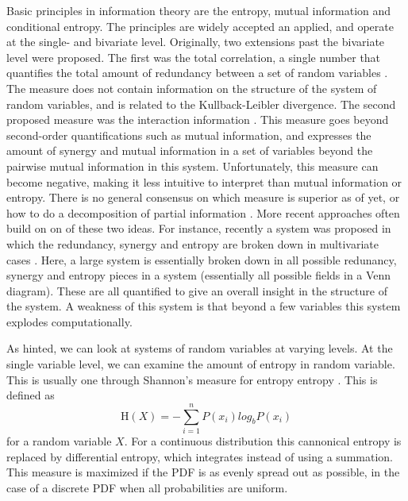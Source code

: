 \documentclass[../main.tex]{subfiles}
\begin{document}
Basic principles in information theory are the entropy, mutual information and conditional entropy.
The principles are widely accepted an applied, and operate at the single- and bivariate level.
Originally, two extensions past the bivariate level were proposed.
The first was the total correlation, a single number that quantifies the total amount of redundancy between a set of random variables \cite{watanabe1960information}. 
The measure does not contain information on the structure of the system of random variables, and is related to the Kullback-Leibler divergence.
The second proposed measure was the interaction information \cite{mcgill1954multivariate}. This measure goes beyond second-order quantifications such as mutual information, and expresses the amount of synergy and mutual information in a set of variables beyond the pairwise mutual information in this system. 
Unfortunately, this measure can become negative, making it less intuitive to interpret than mutual information or entropy.
There is no general consensus on which measure is superior as of yet, or how to do a decomposition of partial information \cite{griffith2011quantifying, williams2010nonnegative}.
More recent approaches often build on on of these two ideas.
For instance, recently a system was proposed in which the redundancy, synergy and entropy are broken down in multivariate cases \cite{williams2010nonnegative}.
Here, a large system is essentially broken down in all possible redunancy, synergy and entropy pieces in a system (essentially all possible fields in a Venn diagram).
These are all quantified to give an overall insight in the structure of the system.
A weakness of this system is that beyond a few variables this system explodes computationally.

As hinted, we can look at systems of random variables at varying levels.
At the single variable level, we can examine the amount of entropy in random variable.
This is usually one through Shannon's measure for entropy entropy \cite{shannon1949mathematical}.
This is defined as 
%
\begin{equation}
\mathrm{H}(X) = -\sum^n_{i=1} P(x_i) log_b P(x_i)
\end{equation}
%
for a random variable $X$.
For a continuous distribution this cannonical entropy is replaced by differential entropy, which integrates instead of using a summation.
This measure is maximized if the PDF is as evenly spread out as possible, in the case of a discrete PDF when all probabilities are uniform.
\end{document}
